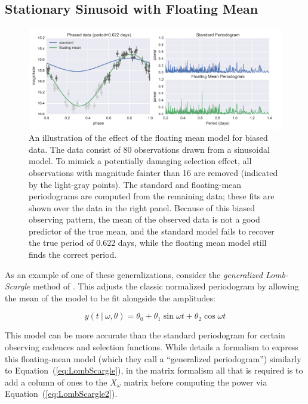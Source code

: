 \documentclass[12pt,preprint]{aastex}
\newcommand{\figlabel}[1]{\label{fig:#1}}
\newcommand{\Eq}[1]{Equation~(\ref{eq:#1})}
\newcommand{\eq}[1]{\Eq{#1}}
\newcommand{\sectlabel}[1]{\label{sect:#1}}
\begin{document}
\subsection{Stationary Sinusoid with Floating Mean}
\sectlabel{floating_mean}

\begin{figure}
  \centering
  \includegraphics[width=\textwidth]{fig02.pdf}
  \caption{
    An illustration of the effect of the floating mean model for biased data.
    The data consist of 80 observations drawn from a sinusoidal model. To mimick a potentially damaging selection effect, all observations with magnitude fainter than 16 are removed (indicated by the light-gray points). The standard and floating-mean periodograms are computed from the remaining data; these fits are shown over the data in the right panel. Because of this biased observing pattern, the mean of the observed data is not a good predictor of the true mean, and the standard model fails to recover the true period of 0.622 days, while the floating mean model still finds the correct period.
  }
  \figlabel{floating_mean}
\end{figure}

As an example of one of these generalizations, consider the {\it generalized Lomb-Scargle} method of \citet{Zechmeister09}. This adjusts the classic normalized periodogram by allowing the mean of the model to be fit alongside the amplitudes:

\begin{equation}
  y(t~|~\omega, \theta) = \theta_0 + \theta_1\sin\omega t + \theta_2\cos\omega t
\end{equation}

This model can be more accurate than the standard periodogram for certain observing cadences and selection functions. While \citet{Zechmeister09} details a formalism to express this floating-mean model (which they call a ``generalized periodogram'') similarly to \eq{LombScargle}, in the matrix formalism all that is required is to add a column of ones to the $X_\omega$ matrix before computing the power via \eq{LombScargle2}.
\end{document}
